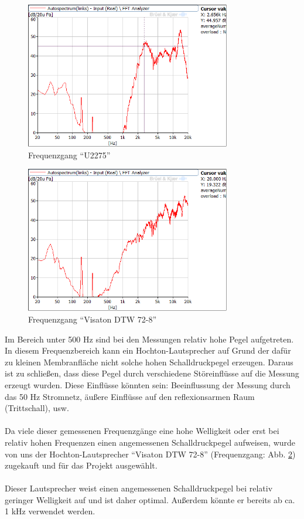 \begin{figure} [H]
	\centering
	\includegraphics[width=0.8\textwidth]{img/LSMessung/HT/U2275_1m_erhoeht.png}
	\caption{Frequenzgang \enquote{U2275}}
	\label{fig:4.3.5}
\end{figure}

\begin{figure} [H]
	\centering
	\includegraphics[width=0.8\textwidth]{img/LSMessung/HT/VisatonDTW72.png}
	\caption{Frequenzgang \enquote{Visaton DTW 72-8}}
	\label{fig:4.3.6}
\end{figure}
\newpage
Im Bereich unter 500 Hz sind bei den Messungen relativ hohe Pegel aufgetreten.
In diesem Frequenzbereich kann ein Hochton-Lautsprecher auf Grund der dafür zu kleinen Membranfläche nicht solche hohen Schalldruckpegel erzeugen.
Daraus ist zu schließen, dass diese Pegel durch verschiedene Störeinflüsse auf die Messung erzeugt wurden.
Diese Einflüsse könnten sein: Beeinflussung der Messung durch das 50 Hz Stromnetz, äußere Einflüsse auf den reflexionsarmen Raum (Trittschall), usw.
\\ \\
Da viele dieser gemessenen Frequenzgänge eine hohe Welligkeit oder erst bei relativ hohen Frequenzen einen angemessenen Schalldruckpegel aufweisen, wurde von uns der Hochton-Lautsprecher \enquote{Visaton DTW 72-8} (Frequenzgang: Abb. \ref{fig:4.3.6}) zugekauft und für das Projekt ausgewählt.
\\ \\
Dieser Lautsprecher weist einen angemessenen Schalldruckpegel bei relativ geringer Welligkeit auf und ist daher optimal.
Außerdem könnte er bereits ab ca. 1 kHz verwendet werden.

